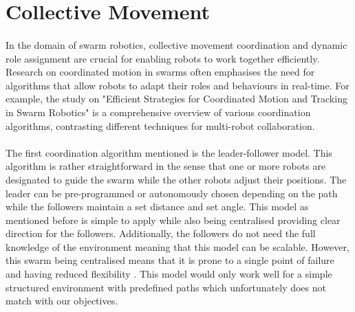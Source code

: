 \section{Collective Movement}

\paragraph*{}
In the domain of swarm robotics, collective movement coordination and dynamic role assignment are crucial for enabling robots to work together efficiently. Research on coordinated motion in swarms often emphasises the need for algorithms that allow robots to adapt their roles and behaviours in real-time. For example, the study on "Efficient Strategies for Coordinated Motion and Tracking in Swarm Robotics" is a comprehensive overview of various coordination algorithms, contrasting different techniques for multi-robot collaboration. 

\paragraph*{}
The first coordination algorithm mentioned is the leader-follower model. This algorithm is rather straightforward in the sense that one or more robots are designated to guide the swarm while the other robots adjust their positions. The leader can be pre-programmed or autonomously chosen depending on the path while the followers maintain a set distance and set angle. This model as mentioned before is simple to apply while also being centralised providing clear direction for the followers. Additionally, the followers do not need the full knowledge of the environment meaning that this model can be scalable. However, this swarm being centralised means that it is prone to a single point of failure and having reduced flexibility \cite{mehta2024robust}. This model would only work well for a simple structured environment with predefined paths which unfortunately does not match with our objectives.

